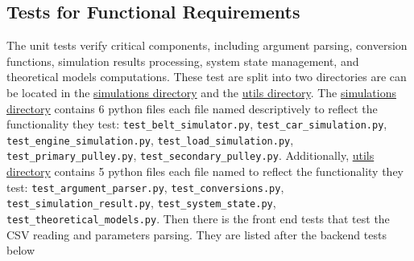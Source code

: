 \documentclass[12pt, titlepage]{article}
\begin{document}
\subsection{Tests for Functional Requirements}
The unit tests verify critical components, including argument parsing, conversion functions, simulation results processing, system state management, and theoretical models computations.
These test are split into two directories are can be located in the \href{https://github.com/gr812b/CVT-Simulator/tree/main/test/simulations}{simulations directory} and the \href{https://github.com/gr812b/CVT-Simulator/tree/main/test/utils}{utils directory}.
The \href{https://github.com/gr812b/CVT-Simulator/tree/main/test/simulations}{simulations directory} contains 6 python files each file named descriptively to reflect the functionality they test: \texttt{test\_belt\_simulator.py}, \texttt{test\_car\_simulation.py}, \texttt{test\_engine\_simulation.py}, \texttt{test\_load\_simulation.py}, \texttt{test\_primary\_pulley.py}, \texttt{test\_secondary\_pulley.py}. 
Additionally, \href{https://github.com/gr812b/CVT-Simulator/tree/main/test/utils}{utils directory} contains 5 python files each file named to reflect the functionality they test: \texttt{test\_argument\_parser.py}, \texttt{test\_conversions.py}, \\ \texttt{test\_simulation\_result.py}, \texttt{test\_system\_state.py}, \\ \texttt{test\_theoretical\_models.py}.
Then there is the front end tests that test the CSV reading and parameters parsing. They are listed after the backend tests below\\
\end{document}
